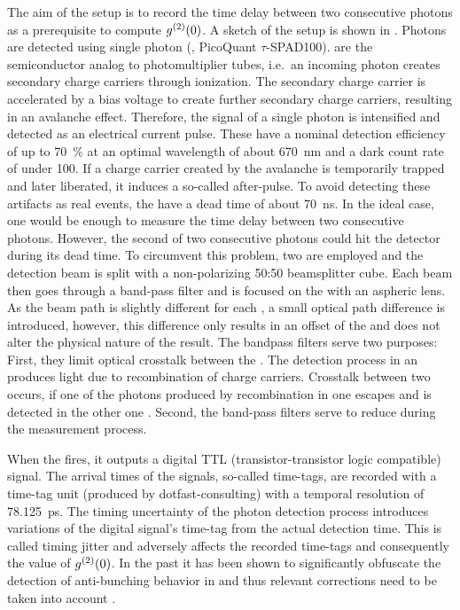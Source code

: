 		The aim of the \hbt setup is to record the time delay between two consecutive photons as a prerequisite to compute $g^{(2)}(0)$.
		A sketch of the \hbt setup is shown in .
		Photons are detected using single photon \apds (\APDs, PicoQuant $\tau${}-SPAD100).
		\APDs are the semiconductor analog to photomultiplier tubes, i.e.\ an incoming photon creates secondary charge carriers through ionization.
		The secondary charge carrier is accelerated by a bias voltage to create further secondary charge carriers, resulting in an avalanche effect.
		Therefore, the signal of a single photon is intensified and detected as an electrical current pulse.
		These \apds have a nominal detection efficiency of up to \SI{70}{\percent} at an optimal wavelength of about \SI{670}{\nm} and a dark count rate of under \SI{100}{\cps}.
		If a charge carrier created by the avalanche is temporarily trapped and later liberated, it induces a so-called after-pulse.
		To avoid detecting these artifacts as real events, the \APDs have a dead time of about \SI{70}{\ns}.
		In the ideal case, one \APD would be enough to measure the time delay between two consecutive photons.
		However, the second of two consecutive photons could hit the detector during its dead time.
		To circumvent this problem, two \APDs are employed and the detection beam is split with a non-polarizing 50:50 beamsplitter cube.
		Each beam then goes through a band-pass filter and is focused on the \apd with an aspheric lens.
		As the beam path is slightly different for each \APD, a small optical path difference is introduced, however, this difference only results in an offset of the \gtf and does not alter the physical nature of the result.
		The bandpass filters serve two purposes:
		First, they limit optical crosstalk between the \apds.
		The detection process in an \apd produces light due to recombination of charge carriers.
		Crosstalk between two \apds occurs, if one of the photons produced by recombination in one \apd escapes and is detected in the other one \cite{Younger2009}.
		Second, the band-pass filters serve to reduce \bkg during the \gt measurement process.

		When the \APD fires, it outputs a digital TTL (transistor-transistor logic compatible) signal.
		The arrival times of the signals, so-called time-tags, are recorded with a time-tag unit (produced by dotfast-consulting) with a temporal resolution of \SI{78.125}{\pico\second}.
		The timing uncertainty of the photon detection process introduces variations of the digital signal's time-tag from the actual detection time.
		This is called timing jitter and adversely affects the recorded time-tags and consequently the value of $g^{(2)}(0)$. In the past it has been shown to significantly obfuscate the detection of anti-bunching behavior in \sps and thus relevant corrections need to be taken into account \cite{Neu2012, Riedrich-moller2014}.

